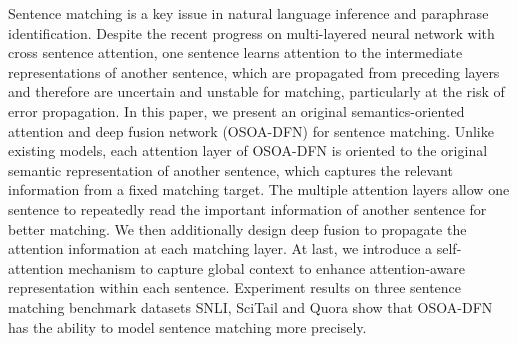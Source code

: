 Sentence matching is a key issue in natural language inference and paraphrase identification. Despite the recent progress on multi-layered neural network with cross sentence attention, one sentence learns attention to the intermediate representations of another sentence, which are propagated from preceding layers and therefore are uncertain and unstable for matching, particularly at the risk of error propagation.
In this paper, we present an original semantics-oriented attention and deep fusion network (OSOA-DFN) for sentence matching. Unlike existing models, each attention layer of OSOA-DFN is oriented to the original semantic representation of another sentence, which captures the relevant information from a fixed matching target. The multiple attention layers allow one sentence to repeatedly read the important information of another sentence for better matching. We then additionally design deep fusion to propagate the attention information at each matching layer. At last, we introduce
a self-attention mechanism to capture global context to enhance attention-aware representation within each sentence. Experiment results on three sentence matching benchmark datasets SNLI, SciTail and Quora show that OSOA-DFN has the ability to model sentence matching more precisely.